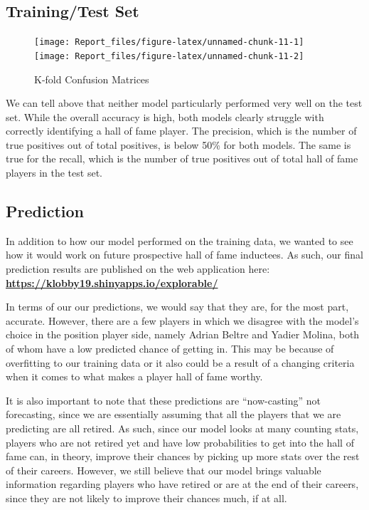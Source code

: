 \documentclass[
]{article}
\begin{document}
\hypertarget{trainingtest-set}{%
\subsection{Training/Test Set}\label{trainingtest-set}}

\begin{figure}

\texttt{[image: Report\_files/figure-latex/unnamed-chunk-11-1]} \texttt{[image: Report\_files/figure-latex/unnamed-chunk-11-2]} \hfill{}

\caption{K-fold Confusion Matrices}\label{fig:unnamed-chunk-11}
\end{figure}

We can tell above that neither model particularly performed very well on
the test set. While the overall accuracy is high, both models clearly
struggle with correctly identifying a hall of fame player. The
precision, which is the number of true positives out of total positives,
is below 50\% for both models. The same is true for the recall, which is
the number of true positives out of total hall of fame players in the
test set.

\hypertarget{prediction}{%
\subsection{Prediction}\label{prediction}}

In addition to how our model performed on the training data, we wanted
to see how it would work on future prospective hall of fame inductees.
As such, our final prediction results are published on the web
application here:
\textbf{\url{https://klobby19.shinyapps.io/explorable/}}

In terms of our our predictions, we would say that they are, for the
most part, accurate. However, there are a few players in which we
disagree with the model's choice in the position player side, namely
Adrian Beltre and Yadier Molina, both of whom have a low predicted
chance of getting in. This may be because of overfitting to our training
data or it also could be a result of a changing criteria when it comes
to what makes a player hall of fame worthy.

It is also important to note that these predictions are ``now-casting''
not forecasting, since we are essentially assuming that all the players
that we are predicting are all retired. As such, since our model looks
at many counting stats, players who are not retired yet and have low
probabilities to get into the hall of fame can, in theory, improve their
chances by picking up more stats over the rest of their careers.
However, we still believe that our model brings valuable information
regarding players who have retired or are at the end of their careers,
since they are not likely to improve their chances much, if at all.
\end{document}
